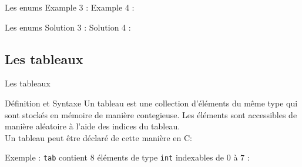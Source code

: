 	\begin{frame}{Les enums}
		Example 3 : 
		\enumFour
		Example 4 : 
		\enumFive
	\end{frame}
	
	\begin{frame}{Les enums}
		Solution 3 : 
		\enumFourSolution
		Solution 4 : 
		\enumFiveSolution
	\end{frame}




  	\subsection{Les tableaux}
  	\begin{frame}{Les tableaux}
  		\begin{block}{Définition et Syntaxe}
  			Un tableau est une collection d'éléments du même type qui sont stockés en mémoire de manière contegieuse. Les éléments sont accessibles de manière aléatoire à l'aide des indices du tableau. \\
  			Un tableau peut être \alert{déclaré} de cette manière en C:
  			\arrayDecl
  		\end{block}
  		\begin{block}{Exemple :}
  			\texttt{tab} contient 8 éléments de type \texttt{int} indexables de $0$ à $7$ : 
  			\arrayDeclExmpl
  		\end{block}
  	\end{frame}
  

